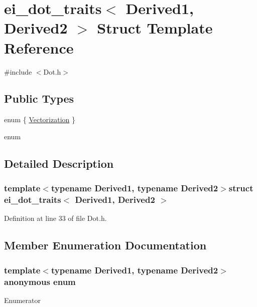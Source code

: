 \hypertarget{structei__dot__traits}{\section{ei\-\_\-dot\-\_\-traits$<$ Derived1, Derived2 $>$ Struct Template Reference}
\label{structei__dot__traits}
}


{\ttfamily \#include $<$Dot.\-h$>$}

\subsection*{Public Types}
\begin{DoxyCompactItemize}
\item 
enum \{ \hyperlink{structei__dot__traits_a257dff14bd2a4a67b38fc3dd77ddf184aa5dde2e22bea1519c4dece6fc6918041}{Vectorization}
 \}
\item 
enum 
\end{DoxyCompactItemize}


\subsection{Detailed Description}
\subsubsection*{template$<$typename Derived1, typename Derived2$>$struct ei\-\_\-dot\-\_\-traits$<$ Derived1, Derived2 $>$}



Definition at line 33 of file Dot.\-h.



\subsection{Member Enumeration Documentation}
\hypertarget{structei__dot__traits_a257dff14bd2a4a67b38fc3dd77ddf184}{\subsubsection[{anonymous enum}]{\setlength{\rightskip}{0pt plus 5cm}template$<$typename Derived1, typename Derived2$>$ anonymous enum}}\label{structei__dot__traits_a257dff14bd2a4a67b38fc3dd77ddf184}
\begin{Desc}
\item[Enumerator]\par
\begin{description}
\item[{\em 
\hypertarget{structei__dot__traits_a257dff14bd2a4a67b38fc3dd77ddf184aa5dde2e22bea1519c4dece6fc6918041}{Vectorization}\label{structei__dot__traits_a257dff14bd2a4a67b38fc3dd77ddf184aa5dde2e22bea1519c4dece6fc6918041}
}]\end{description}
\end{Desc}


